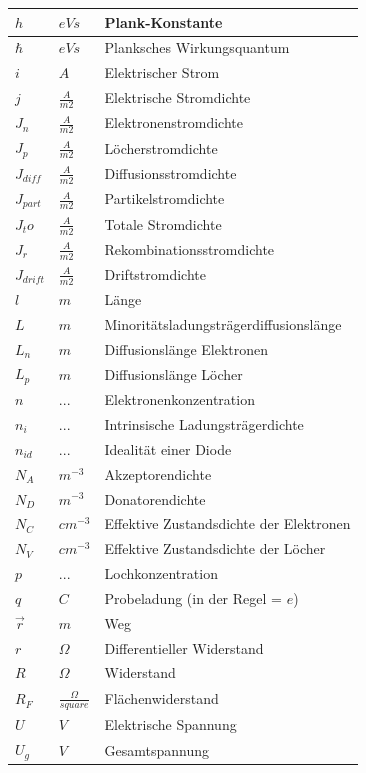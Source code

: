 \documentclass[12pt,a4paper]{article}%
\numberwithin{equation}{section}
\numberwithin{equation}{subsection}
\begin{document}
\begin{longtable} {|p{2cm}|p{3cm}|p{8.4cm}|}
	$h$ & $eVs$ & Plank-Konstante\\ \hline
	$\hbar$ & $eVs$ & Planksches Wirkungsquantum \\ \hline
	$i$ & $A$ & Elektrischer Strom \\ \hline
	$j$ & $\frac{A}{m2}$ & Elektrische Stromdichte \\ \hline
	$J_n$ & $\frac{A}{m2}$ & Elektronenstromdichte \\ \hline
	$J_p$ & $\frac{A}{m2}$ & Löcherstromdichte \\ \hline
	$J_{diff}$ & $\frac{A}{m2}$ & Diffusionsstromdichte \\ \hline
	$J_{part}$ & $\frac{A}{m2}$ & Partikelstromdichte \\ \hline
	$J_to$ & $\frac{A}{m2}$ & Totale Stromdichte \\ \hline
	$J_r$ & $\frac{A}{m2}$ & Rekombinationsstromdichte \\ \hline
	$J_{drift}$ & $\frac{A}{m2}$ & Driftstromdichte \\ \hline
	$l$ & $m$ & Länge \\ \hline
	$L$ & $m$ & Minoritätsladungsträgerdiffusionslänge \\ \hline
	$L_n$ & $m$ & Diffusionslänge Elektronen \\ \hline
	$L_p$ & $m$ & Diffusionslänge Löcher \\ \hline
	
	$n$ & ... & Elektronenkonzentration \\ \hline
	$n_i$ & ... & Intrinsische Ladungsträgerdichte \\ \hline
	$n_{id}$ & ... & Idealität einer Diode \\ \hline
  $N_A$ & $m^{-3}$ & Akzeptorendichte \\ \hline
  $N_D$ & $m^{-3}$ & Donatorendichte \\ \hline
	$N_C$ & $cm^{-3}$ & Effektive Zustandsdichte der Elektronen \\ \hline
	$N_V$ & $cm^{-3}$ & Effektive Zustandsdichte der Löcher \\ \hline
	$p$ & ... & Lochkonzentration \\ \hline
	$q$ & $C$ & Probeladung (in der Regel = $e$) \\ \hline
	$\vec{r}$ & $m$ & Weg \\ \hline
	$r$ & $\Omega$ & Differentieller Widerstand \\ \hline
	$R$ & $\Omega$ & Widerstand \\ \hline
	$R_F$ & $\frac{\Omega}{square}$ & Flächenwiderstand \\ \hline 
	$U$ & $V$ & Elektrische Spannung \\ \hline
	$U_g$ & $V$ & Gesamtspannung \\ \hline
	 

\end{longtable}
\end{document}
